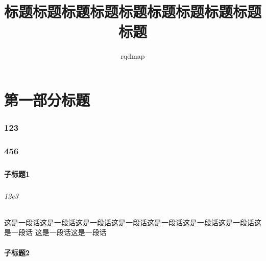 \documentclass[10pt,mathserif]{beamer}%
\title{标题标题标题标题标题标题标题标题标题标题}
\subtitle{\projectName}
\institute[导航栏底部]{组织名} %
\author{rqdmap}
\date{\song{\today}} %
\begin{document}
{\xdbg {}}%


\part{第一部分标题}
\section{123}
\begin{frame}[fragile]
    \frametitle{\currentdeepesttitle}
    \begin{spacing}{1.5}
    \setlength{\parindent}{2em}

    \end{spacing}
\end{frame}

\section{456}
\begin{frame}[fragile]
    \frametitle{\currentdeepesttitle}
    \begin{spacing}{1.5}
    \setlength{\parindent}{2em}
        
    \end{spacing}
\end{frame}

\subsection{子标题1}
\begin{frame}[fragile]
    \frametitle{\currentdeepesttitle}
    \framesubtitle{12e3}
    \begin{spacing}{1.5}
    \setlength{\parindent}{2em}

这是一段话这是一段话这是一段话这是一段话这是一段话这是一段话这是一段话这是一段话
这是一段话这是一段话
        
    \end{spacing}
\end{frame}

\subsection{子标题2}
\begin{frame}[fragile]
    \frametitle{\currentdeepesttitle}
    \begin{spacing}{1.5}
    \setlength{\parindent}{2em}
        
    \end{spacing}
\end{frame}
\begin{frame}[fragile]
    \frametitle{\currentdeepesttitle}
    \setlength{\parindent}{2em}
    \begin{spacing}{1.5}
        
    \end{spacing}
\end{frame}
\end{document}
